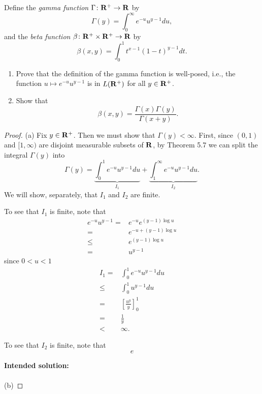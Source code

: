 \begin{problem}
Define the \emph{gamma function} $\Gamma\colon\mathbf{R}^+\to\mathbf{R}$ by
\[
\Gamma(y)=\int_0^\infty e^{-u}u^{y-1} d  u,
\]
and the \emph{beta function} $\beta\colon\mathbf{R}^+\times\mathbf{R}^+\to\mathbf{R}$
by
\[
\beta(x,y)=\int_0^1 t^{x-1}(1-t)^{y-1} d  t.
\]
\begin{enumerate}[label=(\alph*)]
\item Prove that the definition of the gamma function is well-posed, i.e.,
the function $u\mapsto e^{-u}u^{y-1}$ is in $L(\mathbf{R}^+)$ for all
$y\in\mathbf{R}^+$.
\item Show that
\[
\beta(x,y)=\frac{\Gamma(x)\Gamma(y)}{\Gamma(x+y)}.
\]
\end{enumerate}
\end{problem}
\begin{proof}
(a) Fix $y\in\mathbf{R}^+$. Then we must show that $\Gamma(y)<\infty$. First,
since $(0,1)$ and $[1,\infty)$ are disjoint measurable subsets of $\mathbf{R}$,
by Theorem 5.7 we can split the integral $\Gamma(y)$ into
\begin{equation}
\label{eq:split-integral-5}
\Gamma(y)=\underbrace{\int_0^1 e^{-u}u^{y-1} d  u}_{I_1}
+\underbrace{\int_1^\infty e^{-u}u^{y-1} d  u}_{I_2}.
\end{equation}
We will show, separately, that $I_1$ and $I_2$ are finite.

To see that $I_1$ is finite, note that
\begin{equation}
\label{eq:estimate-1-5}
\begin{aligned}
e^{-u}u^{y-1}={}&e^{-u}e^{(y-1)\log u}\\
={}&e^{-u+(y-1)\log u}\\
\leq{}&e^{(y-1)\log u}\\
={}&u^{y-1}
\end{aligned}
\end{equation}
since $0<u<1$
\begin{equation}
\label{eq:estimate-i-1-5}
\begin{aligned}
I_1={}&\int_0^1 e^{-u}u^{y-1} d  u\\
\leq{}&\int_0^1 u^{y-1} d  u\\
={}&\left[\frac{u^y}{y}\right]_0^1\\
={}&\frac{1}{y}\\
<{}&\infty.
\end{aligned}
\end{equation}

To see that $I_2$ is finite, note that
\begin{equation}
\label{eq:estimate-2-5}
e
\end{equation}

\textbf{Intended solution:}
\\\\
(b)
\end{proof}

